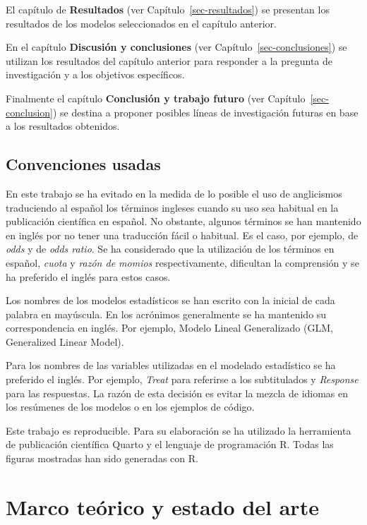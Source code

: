 \documentclass[
  12pt,
  a4paper,
  extrafontsizes,
  onecolumn,
  openright,
  table]{memoir}
\begin{document}
El capítulo de \textbf{Resultados} (ver Capítulo~\ref{sec-resultados})
se presentan los resultados de los modelos seleccionados en el capítulo
anterior.

En el capítulo \textbf{Discusión y conclusiones} (ver
Capítulo~\ref{sec-conclusiones}) se utilizan los resultados del capítulo
anterior para responder a la pregunta de investigación y a los objetivos
específicos.

Finalmente el capítulo \textbf{Conclusión y trabajo futuro} (ver
Capítulo~\ref{sec-conclusion}) se destina a proponer posibles líneas de
investigación futuras en base a los resultados obtenidos.

\hypertarget{convenciones-usadas}{%
\section{Convenciones usadas}\label{convenciones-usadas}}

En este trabajo se ha evitado en la medida de lo posible el uso de
anglicismos traduciendo al español los términos ingleses cuando su uso
sea habitual en la publicación científica en español. No obstante,
algunos términos se han mantenido en inglés por no tener una traducción
fácil o habitual. Es el caso, por ejemplo, de \emph{odds} y de
\emph{odds ratio}. Se ha considerado que la utilización de los términos
en español, \emph{cuota} y \emph{razón de momios} respectivamente,
dificultan la comprensión y se ha preferido el inglés para estos casos.

Los nombres de los modelos estadísticos se han escrito con la inicial de
cada palabra en mayúscula. En los acrónimos generalmente se ha mantenido
su correspondencia en inglés. Por ejemplo, Modelo Lineal Generalizado
(GLM, Generalized Linear Model).

Para los nombres de las variables utilizadas en el modelado estadístico
se ha preferido el inglés. Por ejemplo, \emph{Treat} para referirse a
los subtitulados y \emph{Response} para las respuestas. La razón de esta
decisión es evitar la mezcla de idiomas en los resúmenes de los modelos
o en los ejemplos de código.

Este trabajo es reproducible. Para su elaboración se ha utilizado la
herramienta de publicación científica Quarto y el lenguaje de
programación R. Todas las figuras mostradas han sido generadas con R.


\hypertarget{sec-arte}{%
\chapter{Marco teórico y estado del arte}\label{sec-arte}}
\end{document}
